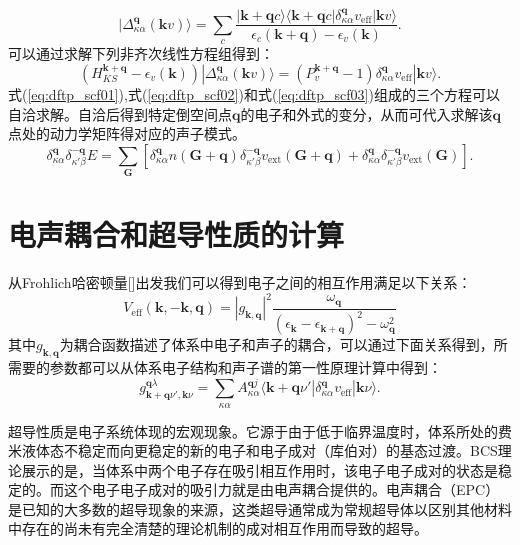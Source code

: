 \begin{equation}\label{eq:dftp_scf02}
  | \Delta^{\bm{q}}_{\kappa\alpha}(\bm{k}v) \rangle =
  \sum_c \frac{|\bm{k}+\bm{q}c\rangle \langle \bm{k}+\bm{q}c | \delta^{\bm{q}}_{\kappa\alpha} v_\mathrm{eff} | \bm{k}v \rangle}
  {\epsilon_c(\bm{k}+\bm{q})-\epsilon_v(\bm{k})}.
\end{equation}
可以通过求解下列非齐次线性方程组得到：
\begin{equation}\label{eq:dftp_scf03}
  (H^{\bm{k}+\bm{q}}_{KS}-\epsilon_v(\bm{k}))|\Delta^{\bm{q}}_{\kappa\alpha}(\bm{k}v)\rangle =
  (P^{\bm{k}+\bm{q}}_v-1)\delta^{\bm{q}}_{\kappa\alpha}v_\mathrm{eff}|\bm{k}v\rangle .
\end{equation}
式(\ref{eq:dftp_scf01}),式(\ref{eq:dftp_scf02})和式(\ref{eq:dftp_scf03})组成的三个方程可以自洽求解。自洽后得到特定倒空间点$\bm{q}$的电子和外式的变分，从而可代入求解该$\bm{q}$点处的动力学矩阵得对应的声子模式。
\begin{equation}
  \delta^{\bm{q}}_{\kappa\alpha}\delta^{-\bm{q}}_{\kappa'\beta} E =
  \sum_{\bm{G}} [ \delta^{\bm{q}}_{\kappa\alpha}n(\bm{G}+\bm{q})\delta^{\bm{-q}}_{\kappa'\beta}v_\mathrm{ext}(\bm{G}+\bm{q}) + \delta^{\bm{q}}_{\kappa\alpha}\delta^{\bm{-q}}_{\kappa'\beta} v_\mathrm{ext}(\bm{G})].
\end{equation}

\section{电声耦合和超导性质的计算}
从Frohlich哈密顿量[]出发我们可以得到电子之间的相互作用满足以下关系：
\begin{equation}
  V_{\mathrm{eff}}(\bm{k},-\bm{k},\bm{q}) = |g_{\bm{k},\bm{q}}|^2
  \frac{\omega_{\bm{q}}}{(\epsilon_{\bm{k}}-\epsilon_{\bm{k}+\bm{q}})^2-\omega^2_{\bm{q}}}
\end{equation}
其中$g_{\bm{k},\bm{q}}$为耦合函数描述了体系中电子和声子的耦合，可以通过下面关系得到，所需要的参数都可以从体系电子结构和声子谱的第一性原理计算中得到：
\begin{equation}\label{eq:coupling_coeff}
  g^{\bm{q}\lambda}_{\bm{k}+\bm{q}\nu',\bm{k}\nu} =
  \sum_{\kappa\alpha} A^{\bm{q}j}_{\kappa\alpha}
  \langle {\bm{k}+\bm{q}\nu'} | {\delta^{\bm{q}}_{\kappa\alpha}v_{\mathrm{eff}}} | {\bm{k}\nu} \rangle .
\end{equation}

超导性质是电子系统体现的宏观现象。它源于由于低于临界温度时，体系所处的费米液体态不稳定而向更稳定的新的电子和电子成对（库伯对）的基态过渡。BCS理论\cite{bardeen1957theory}展示的是，当体系中两个电子存在吸引相互作用时，该电子电子成对的状态是稳定的。而这个电子电子成对的吸引力就是由电声耦合提供的。电声耦合（EPC）是已知的大多数的超导现象的来源，这类超导通常成为常规超导体以区别其他材料中存在的尚未有完全清楚的理论机制的成对相互作用而导致的超导。

